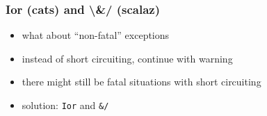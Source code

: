 \documentclass{beamer}
\begin{document}
\begin{frame}
  \frametitle{Ior (cats) and \textbackslash{}\&/ (scalaz)}
  \begin{itemize}
  \item what about ``non-fatal'' exceptions
  \item instead of short circuiting, continue with warning
  \item there might still be fatal situations with short circuiting
  \item solution: \texttt{Ior} and \texttt{\&/}
  \end{itemize}
\end{frame}
\end{document}

